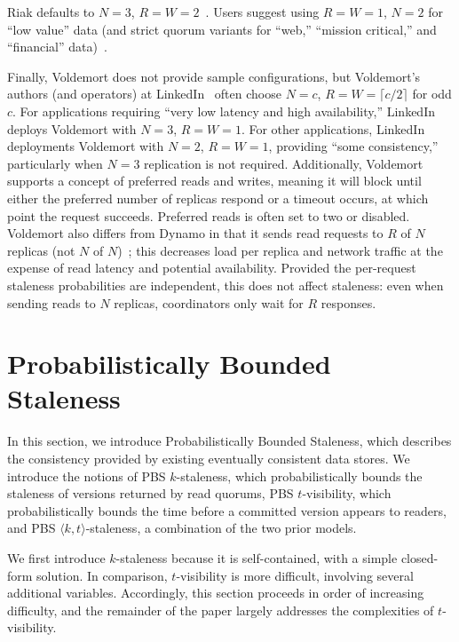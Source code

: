 \documentclass{vldb}
\newcommand{\sectionskip}{-0em}
\begin{document}
Riak defaults to $N$$=$$3$, $R$$=$$W$$=$$2$~\cite{riakdefault-n,
  riakdefault-rw}. Users suggest using $R$$=$$W$$=$$1$, $N$$=$$2$ for
``low value'' data (and strict quorum variants for ``web,''
``mission critical,'' and ``financial'' data)~\cite{riaktalkone,
  riaktalktwo}.

 Finally, Voldemort does not provide sample configurations, but
 Voldemort's authors (and operators) at LinkedIn~\cite{feinbergpc}
 often choose $N$$=$$c$, $R$$=$$W$$=$$ \lceil c/2 \rceil$ for odd $c$.
 For applications requiring ``very low latency and high
 availability,'' LinkedIn deploys Voldemort with $N$$=$$3$,
 $R$$=$$W$$=$$1$.  For other applications, LinkedIn deployments
 Voldemort with $N$$=$$2$, $R$$=$$W$$=$$1$, providing ``some
 consistency,'' particularly when $N$$=$$3$ replication is not
 required.  Additionally, Voldemort supports a concept of preferred
 reads and writes, meaning it will block until either the preferred
 number of replicas respond or a timeout occurs, at which point the
 request succeeds. Preferred reads is often set to two or disabled.  Voldemort
 also differs from Dynamo in that it sends read requests to $R$ of $N$
 replicas (not $N$ of $N$)~\cite{voldemortpub}; this decreases load
 per replica and network traffic at the expense of read latency and
 potential availability.  Provided the per-request staleness
 probabilities are independent, this does not affect staleness: even
 when sending reads to $N$ replicas, coordinators only wait for $R$
 responses.


\vspace{\sectionskip}\section{Probabilistically Bounded\\Staleness}
\label{sec:pbs}

In this section, we introduce Probabilistically Bounded Staleness,
which describes the consistency provided by existing eventually
consistent data stores.  We introduce the notions of PBS
$k$-staleness, which probabilistically bounds the staleness of versions
returned by read quorums, PBS $t$-visibility, which probabilistically
bounds the time before a committed version appears to readers, and PBS
$\langle k, t \rangle$-staleness, a combination of the two prior
models.

We first introduce $k$-staleness because it is self-contained, with a
simple closed-form solution.  In comparison, $t$-visibility is more
difficult, involving several additional variables.  Accordingly, this
section proceeds in order of increasing difficulty, and the remainder
of the paper largely addresses the complexities of $t$-visibility.
\end{document}
